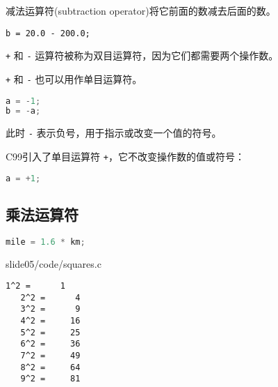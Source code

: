 \begin{frame}[fragile]\ft{\subsecname}
减法运算符(subtraction operator)将它前面的数减去后面的数。\vspace{1em}

\begin{lstlisting}
b = 20.0 - 200.0;
\end{lstlisting}
\vspace{1em}

\lstinline|+| 和 \lstinline|-| 运算符被称为双目运算符，因为它们都需要两个操作数。
\end{frame}


\begin{frame}[fragile]\ft{\subsecname}
  \lstinline|+| 和 \lstinline|-| 也可以用作单目运算符。
\vspace{1em}

\begin{lstlisting}[language=c,backgroundcolor=\color{red!10}]
a = -1;
b = -a;
\end{lstlisting}
此时 \lstinline|-| 表示负号，用于指示或改变一个值的符号。
\vspace{1em}

C99引入了单目运算符 \lstinline|+|，它不改变操作数的值或符号：
\begin{lstlisting}[language=c,backgroundcolor=\color{red!10}]
a = +1;
\end{lstlisting}
\end{frame}

\subsection{乘法运算符}
\begin{frame}[fragile]\ft{\subsecname}
\begin{lstlisting}[language=c,backgroundcolor=\color{red!10}]
  mile = 1.6 * km;
\end{lstlisting}
\vspace{1em}

\end{frame}


\begin{frame}[fragile]\ft{\subsecname}

  
  {slide05/code/squares.c}
\end{frame}


\begin{frame}[fragile]\ft{\subsecname}
\begin{lstlisting}[backgroundcolor=\color{red!10}]
   1^2 =      1
   2^2 =      4
   3^2 =      9
   4^2 =     16
   5^2 =     25
   6^2 =     36
   7^2 =     49
   8^2 =     64
   9^2 =     81
\end{lstlisting}
\end{frame}



